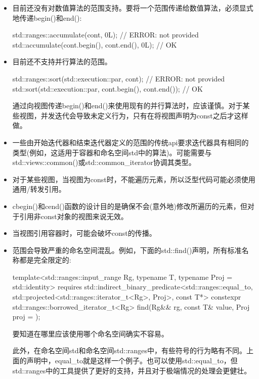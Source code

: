 \begin{itemize}
\item
目前还没有对数值算法的范围支持。要将一个范围传递给数值算法，必须显式地传递begin()和end():

\begin{cpp}
std::ranges::accumulate(cont, 0L); // ERROR: not provided
std::accumulate(cont.begin(), cont.end(), 0L); // OK
\end{cpp}

\item
目前还不支持并行算法的范围。

\begin{cpp}
std::ranges::sort(std::execution::par, cont); // ERROR: not provided
std::sort(std::execution::par, cont.begin(), cont.end()); // OK
\end{cpp}

通过向视图传递begin()和end()来使用现有的并行算法时，应该谨慎。对于某些视图，并发迭代会导致未定义行为，只有在将视图声明为const之后才这样做。

\item
一些由开始迭代器和结束迭代器定义的范围的传统api要求迭代器具有相同的类型(例如，这适用于容器和命名空间std中的算法)。可能需要与std::views::common()或std::common\_iterator协调其类型。

\item
对于某些视图，当视图为const时，不能遍历元素，所以泛型代码可能必须使用通用/转发引用。

\item
cbegin()和cend()函数的设计目的是确保不会(意外地)修改所遍历的元素，但对于引用非const对象的视图来说无效。

\item
当视图引用容器时，可能会破坏const的传播。

\item
范围会导致严重的命名空间混乱。例如，下面的std::find()声明，所有标准名称都是完全限定的:

\begin{cpp}
template<std::ranges::input_range Rg,
				typename T,
				typename Proj = std::identity>
requires std::indirect_binary_predicate<std::ranges::equal_to,
									std::projected<std::ranges::iterator_t<Rg>, Proj>,
									const T*>
constexpr std::ranges::borrowed_iterator_t<Rg>
	find(Rg&& rg, const T& value, Proj proj = {});
\end{cpp}

要知道在哪里应该使用哪个命名空间确实不容易。

此外，在命名空间std和命名空间std::ranges中，有些符号的行为略有不同。上面的声明中，equal\_to就是这样一个例子。也可以使用std::equal\_to，但std::ranges中的工具提供了更好的支持，并且对于极端情况的处理会更健壮。
\end{itemize}














